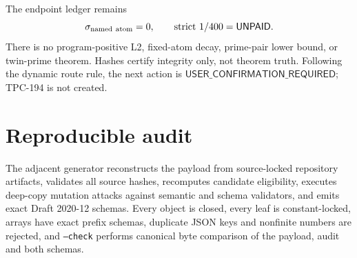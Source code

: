 \documentclass[11pt]{article}
\begin{document}
The endpoint ledger remains
\[
 \sigma_{\rm named\ atom}=0,\qquad
 \text{strict }1/400=\mathsf{UNPAID}.
\]
There is no program-positive L2, fixed-atom decay, prime-pair lower bound,
or twin-prime theorem.  Hashes certify integrity only, not theorem truth.
Following the dynamic route rule, the next action is
\(\mathsf{USER\_CONFIRMATION\_REQUIRED}\); TPC-194 is not created.

\section{Reproducible audit}

The adjacent generator reconstructs the payload from source-locked
repository artifacts, validates all source hashes, recomputes candidate
eligibility, executes deep-copy mutation attacks against semantic and
schema validators, and emits exact Draft 2020-12 schemas.  Every object is
closed, every leaf is constant-locked, arrays have exact prefix schemas,
duplicate JSON keys and nonfinite numbers are rejected, and
\texttt{--check} performs canonical byte comparison of the payload, audit
and both schemas.



\end{document}
